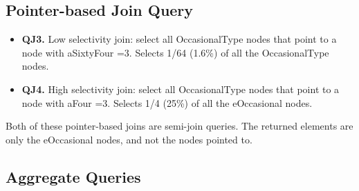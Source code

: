 \subsection{Pointer-based Join Query}
\begin {itemize}
\item {\bf QJ3.} Low selectivity join: select all {\sf OccasionalType} nodes that point to a node with {\sf
aSixtyFour =3}.  Selects 1/64 (1.6\%) of all the {\sf OccasionalType} nodes.
\item {\bf QJ4.} High selectivity join: select all {\sf OccasionalType} nodes that point to a node with {\sf aFour
=3}.  Selects 1/4 (25\%) of all the {\sf eOccasional} nodes.
\end{itemize}
Both of these pointer-based joins are semi-join queries.  The returned
elements are only the {\sf eOccasional} nodes, and not the nodes pointed to.

\subsection{Aggregate Queries}

